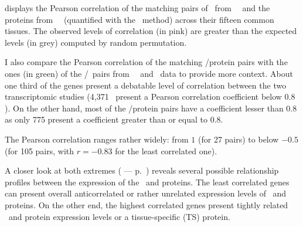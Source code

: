  displays the Pearson correlation
of the matching pairs of \mRNAs\ from \uhlen\ \etal\
and the proteins from \pandey\ \etal\ (quantified with the \PPKM\ method)
across their fifteen common tissues.
The observed levels of correlation (in pink)  are greater
than the expected levels (in grey) computed by random permutation.

I also compare the Pearson correlation of the matching \mRNAs/protein pairs
with the ones (in green) of the \mRNAs{}/\mRNAs\ pairs
from \uhlen\ \etal\ and \gtex\ data
to provide more context.
About one third of the genes present a debatable level of correlation
between the two transcriptomic studies
(4,371 \mRNAs\ present a Pearson correlation coefficient below $0.8$).
On the other hand, most of the \mRNA/protein pairs have a coefficient
lesser than $0.8$ as only 775 present
a coefficient greater than or equal to $0.8$.

The Pearson correlation ranges rather widely:
from $1$ (for 27 pairs)
to below $-0.5$ (for 105 pairs, with $r=-0.83$ for the least correlated one).

A closer look at both extremes ( --- p.~\pageref{fig:caseGene})
reveals several possible relationship profiles
between the expression of the \mRNAs\ and proteins.
The least correlated genes can present
overall anticorrelated or rather unrelated expression levels
of \mRNAs\ and proteins.
On the other end,
the highest correlated genes present
tightly related \mRNA\ and protein expression levels
or a tissue-specific (\gls{TS}) protein.

